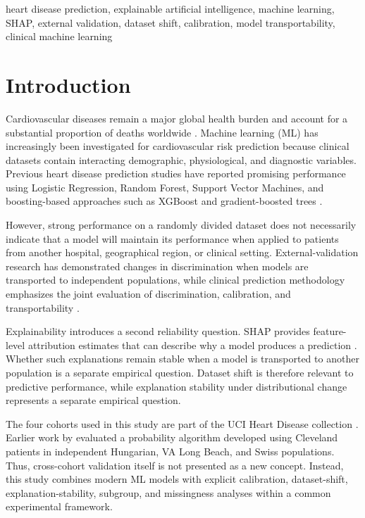 \documentclass[10pt,journal,twocolumn]{IEEEtran}
\begin{document}
\begin{IEEEkeywords}
heart disease prediction,
explainable artificial intelligence,
machine learning,
SHAP,
external validation,
dataset shift,
calibration,
model transportability,
clinical machine learning
\end{IEEEkeywords}


\section{Introduction}

Cardiovascular diseases remain a major global health burden and account for a substantial proportion of deaths worldwide \parencite{who2025}. Machine learning (ML) has increasingly been investigated for cardiovascular risk prediction because clinical datasets contain interacting demographic, physiological, and diagnostic variables. Previous heart disease prediction studies have reported promising
performance using Logistic Regression, Random Forest, Support Vector
Machines, and boosting-based approaches such as XGBoost and
gradient-boosted trees \parencite{bhatt2023,jindal2021,mohan2019}.

However, strong performance on a randomly divided dataset does not necessarily indicate that a model will maintain its performance when applied to patients from another hospital, geographical region, or clinical setting. External-validation research has demonstrated changes in discrimination when models are transported to independent populations, while clinical prediction methodology emphasizes the joint evaluation of discrimination, calibration, and transportability \parencite{wessler2021,gulati2022,vancalster2019}.

Explainability introduces a second reliability question. SHAP
provides feature-level attribution estimates that can describe
why a model produces a prediction \parencite{lundberg2017}.
Whether such explanations remain stable when a model is transported to another population is a separate empirical question. Dataset shift is therefore relevant to predictive performance, while explanation stability under distributional change represents a separate empirical question.

The four cohorts used in this study are part of the UCI Heart Disease collection \parencite{uciheart}. Earlier work by \textcite{detrano1989} evaluated a probability algorithm developed using Cleveland patients in independent Hungarian, VA Long Beach, and Swiss populations. Thus, cross-cohort validation itself is not presented as a new concept. Instead, this study combines modern ML models with explicit calibration, dataset-shift, explanation-stability, subgroup, and missingness analyses within a common experimental framework.
\end{document}
